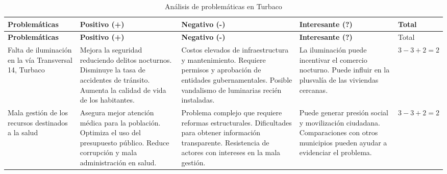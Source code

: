 \documentclass[letterpaper, 11pt]{report}
\begin{document}
\begin{longtable}{|p{.2\linewidth}|p{.2\linewidth}|p{.2\linewidth}|p{.2\linewidth}|p{.1\linewidth}|}
      \caption{Análisis de problemáticas en Turbaco}                                                                                                                                                                      \\
      \hline
      \textbf{Problemáticas}                                                       & \textbf{Positivo (+)}                                                     & \textbf{Negativo (-)} & \textbf{Interesante (?)} & Total \\
      \hline
      \endfirsthead

      \hline
      \textbf{Problemáticas}                                                       & \textbf{Positivo (+)}                                                     & \textbf{Negativo (-)} & \textbf{Interesante (?)} & Total \\
      \hline
      \endhead

      \hline
      \endfoot

      \hline
      \endlastfoot

      Falta de iluminación en la vía Transversal 14, Turbaco                       & Mejora la seguridad
      reduciendo delitos nocturnos. Disminuye la tasa de accidentes de tránsito.
      Aumenta la calidad de vida de los habitantes.                                & Costos elevados de
      infraestructura y mantenimiento. Requiere permisos y aprobación de entidades
      gubernamentales. Posible vandalismo de luminarias recién instaladas.         & La
      iluminación puede incentivar el comercio nocturno. Puede influir en la
      plusvalía de las viviendas cercanas.                                         & $3 - 3 + 2 = 2$                                                                                                                      \\ \hline

      Mala gestión de los recursos destinados a la salud                           & Asegura mejor atención
      médica para la población. Optimiza el uso del presupuesto público. Reduce
      corrupción y mala administración en salud.                                   & Problema complejo que requiere
      reformas estructurales. Dificultades para obtener información transparente.
      Resistencia de actores con intereses en la mala gestión.                     & Puede generar
      presión social y movilización ciudadana. Comparaciones con otros municipios
      pueden ayudar a evidenciar el problema.                                      & $3 - 3 + 2 = 2$                                                                                                                      \\ \hline


\end{longtable}
\end{document}
